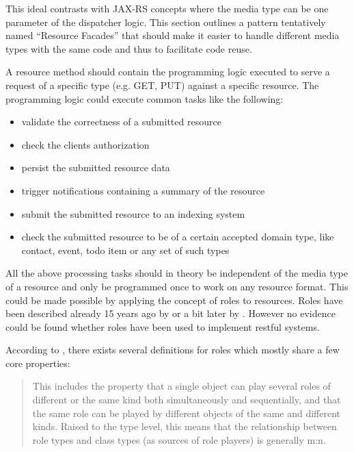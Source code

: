 \documentclass[12pt,a4paper,twoside]{scrartcl}		%
\begin{document}
This ideal contrasts with JAX-RS concepts where the media type can be one
parameter of the dispatcher logic. This section outlines a pattern tentatively
named ``Resource Facades'' that should make it easier to handle different media
types with the same code and thus to facilitate code reuse.


A resource method should contain the programming logic executed to serve a
request of a specific type (e.g. GET, PUT) against a specific resource. The
programming logic could execute common tasks like the following:

\begin{itemize}
\item validate the correctness of a submitted resource
\item check the clients authorization
\item persist the submitted resource data
\item trigger notifications containing a summary of the resource
\item submit the submitted resource to an indexing system
\item check the submitted resource to be of a certain accepted domain type, like
  contact, event, todo item or any set of such types
\end{itemize}

All the above processing tasks should in theory be independent of the media type
of a resource and only be programmed once to work on any resource format. This
could be made possible by applying the concept of roles to resources. Roles have
been described already 15 years ago by \cite{Fowler1997} or a bit later by
\cite{Baeumer2000}. However no evidence could be found whether roles have been
used to implement restful systems.

According to \cite{Steimann2008}, there exists several definitions for roles
which mostly share a few core properties:

\begin{quote}
  This includes the property that a single object can play several roles of
  different or the same kind both simultaneously and sequentially, and that the
  same role can be played by different objects of the same and different
  kinds. Raised to the type level, this means that the relationship between role
  types and class types (as sources of role players) is generally m:n.
\end{quote}
\end{document}
